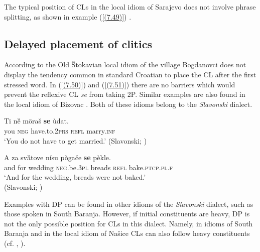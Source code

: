\noindent The typical position of CLs in the local idiom of Sarajevo does not involve phrase splitting, as shown in example (\ref{(7.49)}) \citep[62]{HTS09}.


\subsection{Delayed placement of clitics}
\label{Delayed placement of clitics}
According to \citet[273]{Raguz16} the Old Štokavian local idiom of the village Bogdanovci does not display the tendency common in standard Croatian to place the CL after the first stressed word. In (\ref{(7.50)}) and (\ref{(7.51)}) there are no barriers which would prevent the reflexive CL \textit{se} from taking 2P. Similar examples are also found in the local idiom of Bizovac \citep[cf.][144]{Klaic07}. Both of these idioms belong to the \textit{Slavonski} dialect. 

\begin{exe}\ex\label{(7.50)}
\gll Ti nȅ  mōraš \textbf{se}  ùdat.  \\
you \textsc{neg} have.to.2\textsc{prs}  \textsc{refl}  marry.\textsc{inf}  \\
\glt ‘You do not have to get married.’
\hfill  (Slavonski; \citealt[273]{Raguz16})

\ex\label{(7.51)}
\gll A za svȁtove nísu  pògače  \textbf{se}  pèkle. \\
and for wedding \textsc{neg}.be.\textsc{3pl}  breads \textsc{refl}  bake.\textsc{ptcp.pl.f} \\
\glt ‘And for the wedding, breads were not baked.’ \\
\hfill (Slavonski; \citealt[273]{Raguz16})
\end{exe}

\noindent Examples with DP can be found in other idioms of the \textit{Slavonski} dialect, such as those spoken in South Baranja. However, if initial constituents are heavy, DP is not the only possible position for CLs in this dialect. Namely, in idioms of South Baranja and in the local idiom of Našice CLs can also follow heavy constituents (cf. \citealt[412f]{Sekeres77}, \citealt[264]{Sekeres66}).

